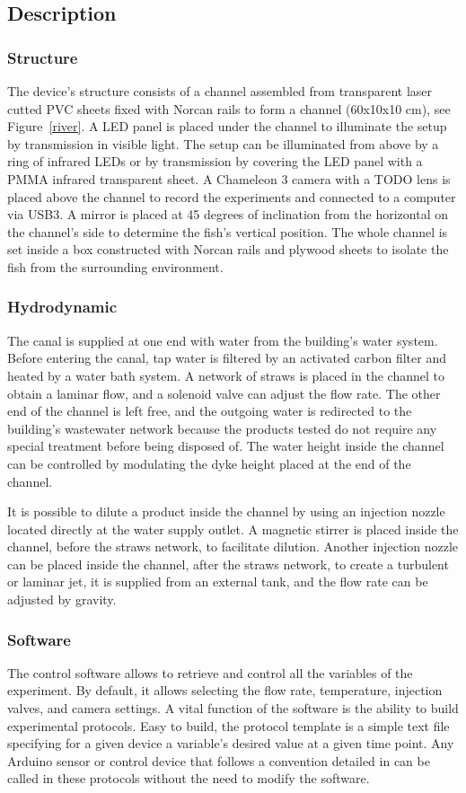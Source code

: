 \subsection{Description}
  \subsubsection{Structure}
  The device's structure consists of a channel assembled from transparent laser cutted PVC sheets fixed with Norcan rails to form a channel (60x10x10 cm), see Figure~\ref{river}. A LED panel is placed under the channel to illuminate the setup by transmission in visible light. The setup can be illuminated from above by a ring of infrared LEDs or by transmission by covering the LED panel with a PMMA infrared transparent sheet. A Chameleon 3 camera with a TODO lens is placed above the channel to record the experiments and connected to a computer via USB3. A mirror is placed at 45 degrees of inclination from the horizontal on the channel's side to determine the fish's vertical position. The whole channel is set inside a box constructed with Norcan rails and plywood sheets to isolate the fish from the surrounding environment.

  \subsubsection{Hydrodynamic}
  The canal is supplied at one end with water from the building's water system. Before entering the canal, tap water is filtered by an activated carbon filter and heated by a water bath system. A network of straws is placed in the channel to obtain a laminar flow, and a solenoid valve can adjust the flow rate. The other end of the channel is left free, and the outgoing water is redirected to the building's wastewater network because the products tested do not require any special treatment before being disposed of. The water height inside the channel can be controlled by modulating the dyke height placed at the end of the channel.

  It is possible to dilute a product inside the channel by using an injection nozzle located directly at the water supply outlet. A magnetic stirrer is placed inside the channel, before the straws network, to facilitate dilution. Another injection nozzle can be placed inside the channel, after the straws network, to create a turbulent or laminar jet, it is supplied from an external tank, and the flow rate can be adjusted by gravity.


  \subsubsection{Software}
  The control software allows to retrieve and control all the variables of the experiment. By default, it allows selecting the flow rate, temperature, injection valves, and camera settings. A vital function of the software is the ability to build experimental protocols. Easy to build, the protocol template is a simple text file specifying for a given device a variable's desired value at a given time point. Any Arduino sensor or control device that follows a convention detailed in \url{} can be called in these protocols without the need to modify the software.


